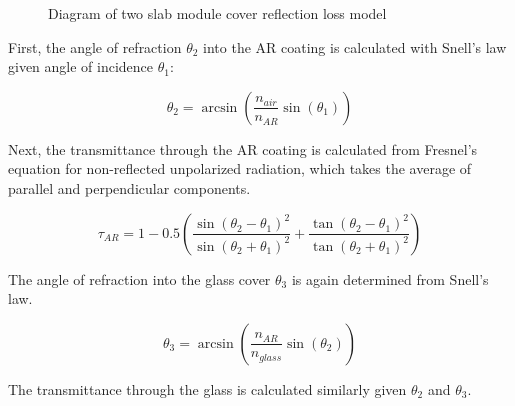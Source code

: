\documentclass[12pt,letterpaper]{article}
\begin{document}
\begin{figure}[h!]
\begin{center}
\end{center}
\caption{Diagram of two slab module cover reflection loss model}
\label{fig_twoslab_model}
\end{figure}

First, the angle of refraction $\theta_2$ into the AR coating is calculated with Snell's law given angle of incidence $\theta_1$:

\begin{equation}\label{snell1}
\theta_2 = \arcsin\left( \frac{n_{air}}{n_{AR}} \sin(\theta_1 ) \right)
\end{equation}

Next, the transmittance through the AR coating is calculated from Fresnel's equation for non-reflected unpolarized radiation, which takes the average of parallel and perpendicular components.

\begin{equation}\label{fresnel1}
\tau_{AR} = 1 - 0.5
        \left( \frac{\sin(\theta_2-\theta_1)^2}{\sin(\theta_2+\theta_1)^2} 
               + \frac{\tan(\theta_2-\theta_1)^2}{\tan(\theta_2+\theta_1)^2}  \right)
\end{equation}

The angle of refraction into the glass cover $\theta_3$ is again determined from Snell's law.

\begin{equation}\label{snell1}
\theta_3 = \arcsin\left( \frac{n_{AR}}{n_{glass}} \sin(\theta_2 ) \right)
\end{equation}

The transmittance through the glass is calculated similarly given $\theta_2$ and $\theta_3$.
\end{document}

